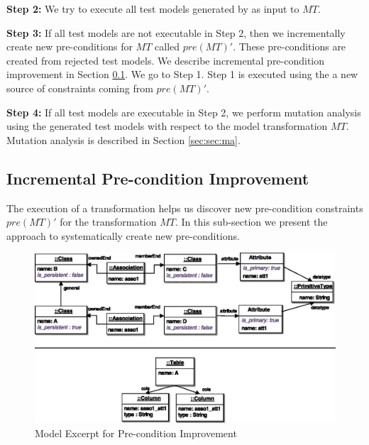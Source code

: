 \noindent \textbf{Step 2:} 	We try to execute all test models generated by {\Pramana} as input to $MT$.

\noindent \textbf{Step 3:}   If all test models are not executable  in Step 2, then we incrementally create new pre-conditions for $MT$ called $pre(MT)'$. These pre-conditions are created from rejected test models. We describe incremental pre-condition improvement in Section \ref{sec:sec:precond}. We go to Step 1. Step 1 is executed using the a new source of constraints coming from $pre(MT)'$. 

\noindent \textbf{Step 4:} 	 If all test models are executable  in Step 2, we perform mutation analysis using the generated test models with respect to the model transformation $MT$. Mutation analysis is described in Section \ref{sec:sec:ma}.

\subsection{Incremental Pre-condition Improvement}
\label{sec:sec:precond}

The execution of a transformation helps us discover new pre-condition constraints $pre(MT)'$ for the transformation $MT$. In this sub-section we present the approach to systematically create new pre-conditions.

\begin{figure} 
\begin{center}
\includegraphics[width=6 in]{./figures/model-excerpt-for-constraint-improvment.eps}
\end{center}
\caption{Model Excerpt for Pre-condition Improvement}
\label{fig:modelExcerpt}
\end{figure}

